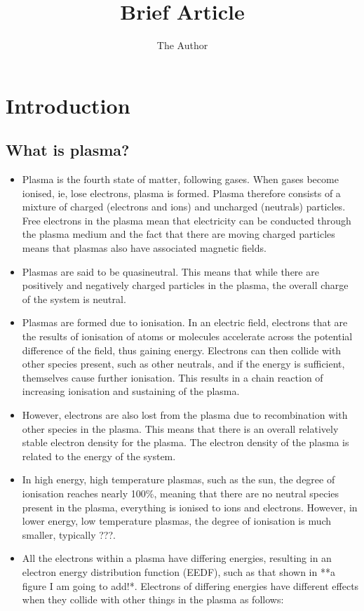 \documentclass[11pt, oneside]{article}   	%
\title{Brief Article}
\author{The Author}
\begin{document}
\maketitle
\section{Introduction}

\subsection{What is plasma?}

\begin{itemize}
\item Plasma is the fourth state of matter, following gases. When gases become ionised, ie, lose electrons, plasma is formed. Plasma therefore consists of a mixture of charged (electrons and ions) and uncharged (neutrals) particles. Free electrons in the plasma mean that electricity can be conducted through the plasma medium and the fact that there are moving charged particles means that plasmas also have associated magnetic fields.
\item Plasmas are said to be quasineutral. This means that while there are positively and negatively charged particles in the plasma, the overall charge of the system is neutral.
\item Plasmas are formed due to ionisation. In an electric field, electrons that are the results of ionisation of atoms or molecules accelerate across the potential difference of the field, thus gaining energy.
Electrons can then collide with other species present, such as other neutrals, and if the energy is sufficient, themselves cause further ionisation.
This results in a chain reaction of increasing ionisation and sustaining of the plasma.
\item However, electrons are also lost from the plasma due to recombination with other species in the plasma.
This means that there is an overall relatively stable electron density for the plasma. 
The electron density of the plasma is related to the energy of the system.
\item In high energy, high temperature plasmas, such as the sun, the degree of ionisation reaches nearly 100\%, meaning that there are no neutral species present in the plasma, everything is ionised to ions and electrons. 
However, in lower energy, low temperature plasmas, the degree of ionisation is much smaller, typically ???.
\item All the electrons within a plasma have differing energies, resulting in an electron energy distribution function (EEDF), such as that shown in **a figure I am going to add!*. Electrons of differing energies have different effects when they collide with other things in the plasma as follows:

\end{itemize}
\end{document}

